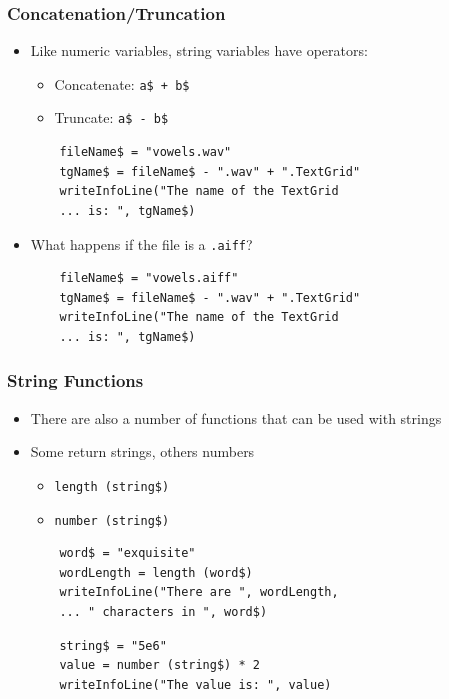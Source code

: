 \documentclass[handout]{beamer}
\begin{document}
\begin{frame}[fragile]
\frametitle{Concatenation/Truncation}
\begin{itemize}
    \item <1-> Like numeric variables, string variables have operators:
    \begin{itemize}
        \item Concatenate: \texttt{a\$ + b\$}
        \item Truncate: \texttt{a\$ - b\$}
    \end{itemize}

    \begin{verbatim}
    fileName$ = "vowels.wav"
    tgName$ = fileName$ - ".wav" + ".TextGrid"
    writeInfoLine("The name of the TextGrid
    ... is: ", tgName$)
    \end{verbatim}

    \item<3-> What happens if the file is a \texttt{.aiff}?
    \begin{verbatim}
    fileName$ = "vowels.aiff"
    tgName$ = fileName$ - ".wav" + ".TextGrid"
    writeInfoLine("The name of the TextGrid
    ... is: ", tgName$)
    \end{verbatim}

\end{itemize}
\end{frame}

\begin{frame}[fragile]
\frametitle{String Functions}
\begin{itemize}
    \item <1-> There are also a number of functions that can be used with strings

    \item <1-> Some return strings, others numbers
    \begin{itemize}
        \item \texttt{length (string\$)}
        \item \texttt{number (string\$)}
    \end{itemize}

    \begin{verbatim}
    word$ = "exquisite"
    wordLength = length (word$)
    writeInfoLine("There are ", wordLength,
    ... " characters in ", word$)
    \end{verbatim}

    \begin{verbatim}
    string$ = "5e6"
    value = number (string$) * 2
    writeInfoLine("The value is: ", value)
    \end{verbatim}

\end{itemize}
\end{frame}
\end{document}

